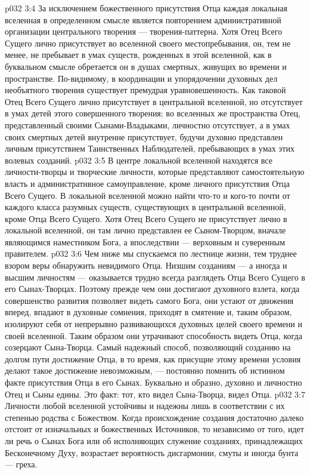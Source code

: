 \vs p032 3:4 \pc За исключением божественного присутствия Отца каждая локальная вселенная в определенном смысле является повторением административной организации центрального творения --- творения\hyp{}паттерна. Хотя Отец Всего Сущего лично присутствует во вселенной своего местопребывания, он, тем не менее, не пребывает в умах существ, рожденных в этой вселенной, как в буквальном смысле обретается он в душах смертных, живущих во времени и пространстве. По\hyp{}видимому, в координации и упорядочении духовных дел необъятного творения существует премудрая уравновешенность. Как таковой Отец Всего Сущего лично присутствует в центральной вселенной, но отсутствует в умах детей этого совершенного творения; во вселенных же пространства Отец, представленный своими Сынами\hyp{}Владыками, личностно отсутствует, а в умах своих смертных детей внутренне присутствует, будучи духовно представлен личным присутствием Таинственных Наблюдателей, пребывающих в умах этих волевых созданий.
\vs p032 3:5 В центре локальной вселенной находятся все личности\hyp{}творцы и творческие личности, которые представляют самостоятельную власть и административное самоуправление, кроме личного присутствия Отца Всего Сущего. В локальной вселенной можно найти что\hyp{}то и кого\hyp{}то почти от каждого класса разумных существ, существующих в центральной вселенной, кроме Отца Всего Сущего. Хотя Отец Всего Сущего не присутствует лично в локальной вселенной, он там лично представлен ее Сыном\hyp{}Творцом, вначале являющимся наместником Бога, а впоследствии --- верховным и суверенным правителем.
\vs p032 3:6 Чем ниже мы спускаемся по лестнице жизни, тем труднее взором веры обнаружить невидимого Отца. Низшим созданиям --- а иногда и высшим личностям --- оказывается трудно всегда разглядеть Отца Всего Сущего в его Сынах\hyp{}Творцах. Поэтому прежде чем они достигают духовного взлета, когда совершенство развития позволяет видеть самого Бога, они устают от движения вперед, впадают в духовные сомнения, приходят в смятение и, таким образом, изолируют себя от непрерывно развивающихся духовных целей своего времени и своей вселенной. Таким образом они утрачивают способность видеть Отца, когда созерцают Сына\hyp{}Творца. Самый надежный способ, позволяющий созданию на долгом пути достижение Отца, в то время, как присущие этому времени условия делают такое достижение невозможным, --- постоянно помнить об истинном факте присутствия Отца в его Сынах. Буквально и образно, духовно и личностно Отец и Сыны едины. Это факт: тот, кто видел Сына\hyp{}Творца, видел Отца.
\vs p032 3:7 \pc Личности любой вселенной устойчивы и надежны лишь в соответствии с их степенью родства с Божеством. Когда происхождение создания достаточно далеко отстоит от изначальных и божественных Источников, то независимо от того, идет ли речь о Сынах Бога или об исполняющих служение созданиях, принадлежащих Бесконечному Духу, возрастает вероятность дисгармонии, смуты и иногда бунта --- греха.
